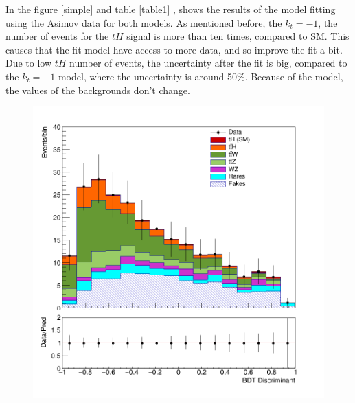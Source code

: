 In the figure \ref{simple} and table \ref{table1} , shows the results of the model fitting using the Asimov data for both models. As mentioned before, the  $k_t=-1$, the number of events for the $tH$ signal is more than ten times, compared to SM. This causes that the fit model have access to more data, and so improve the fit a bit. Due to low $tH$ number of events, the uncertainty after the fit is big, compared to the $k_t=-1$ model, where the uncertainty is around 50$\%$. Because of the model, the values of the backgrounds don't change.
\begin{figure}[!htbp]
	\centering
	\begin{minipage}[b]{0.48\textwidth}
		\includegraphics[width=\textwidth]{Chapter4/simple.png}
	\end{minipage}
	\hfill
	\begin{minipage}[b]{0.48\textwidth}

\end{minipage}
\end{figure}
